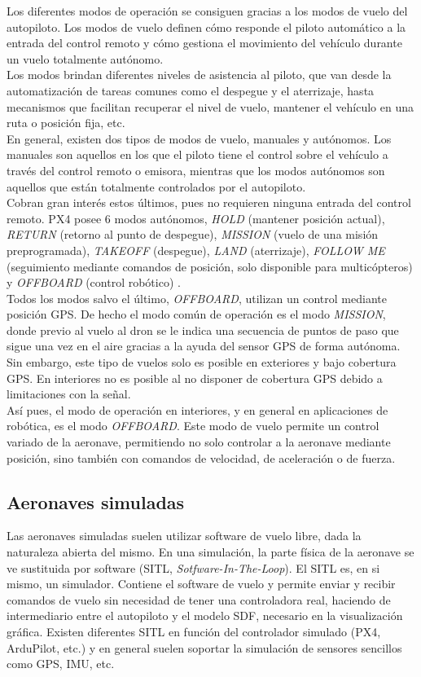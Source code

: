 \documentclass[../main.tex]{subfiles}
\begin{document}
\newpage
Los diferentes modos de operación se consiguen gracias a los modos de vuelo del autopiloto. Los modos de vuelo definen cómo responde el piloto automático a la entrada del control remoto y cómo gestiona el movimiento del vehículo durante un vuelo totalmente autónomo. \\
Los modos brindan diferentes niveles de asistencia al piloto, que van desde la automatización de tareas comunes como el despegue y el aterrizaje, hasta mecanismos que facilitan recuperar el nivel de vuelo, mantener el vehículo en una ruta o posición fija, etc. \\
En general, existen dos tipos de modos de vuelo, manuales y autónomos. Los manuales son aquellos en los que el piloto tiene el control sobre el vehículo a través del control remoto o emisora, mientras que los modos autónomos son aquellos que están totalmente controlados por el autopiloto. \\
Cobran gran interés estos últimos, pues no requieren ninguna entrada del control remoto. PX4 posee 6 modos autónomos, \emph{HOLD} (mantener posición actual), \emph{RETURN} (retorno al punto de despegue), \emph{MISSION} (vuelo de una misión preprogramada), \emph{TAKEOFF} (despegue), \emph{LAND} (aterrizaje), \emph{FOLLOW ME} (seguimiento mediante comandos de posición, solo disponible para multicópteros) y \emph{OFFBOARD} (control robótico) \cite{px4-flight-modes}. \\
Todos los modos salvo el último, \emph{OFFBOARD}, utilizan un control mediante posición GPS. De hecho el modo común de operación es el modo \emph{MISSION}, donde previo al vuelo al dron se le indica una secuencia de puntos de paso que sigue una vez en el aire gracias a la ayuda del sensor GPS de forma autónoma. Sin embargo, este tipo de vuelos solo es posible en exteriores y bajo cobertura GPS. En interiores no es posible al no disponer de cobertura GPS debido a limitaciones con la señal. \\
Así pues, el modo de operación en interiores, y en general en aplicaciones de robótica, es el modo \emph{OFFBOARD}. Este modo de vuelo permite un control variado de la aeronave, permitiendo no solo controlar a la aeronave mediante posición, sino también con comandos de velocidad, de aceleración o de fuerza.

\subsection{Aeronaves simuladas} \label{section:herram-sim}
Las aeronaves simuladas suelen utilizar software de vuelo libre, dada la naturaleza abierta del mismo. En una simulación, la parte física de la aeronave se ve sustituida por software (SITL, \emph{Sotfware-In-The-Loop}). El SITL es, en si mismo, un simulador. Contiene el software de vuelo y permite enviar y recibir comandos de vuelo sin necesidad de tener una controladora real, haciendo de intermediario entre el autopiloto y el modelo SDF, necesario en la visualización gráfica. Existen diferentes SITL en función del controlador simulado (PX4, ArduPilot, etc.) y en general suelen soportar la simulación de sensores sencillos como GPS, IMU, etc.
\end{document}
